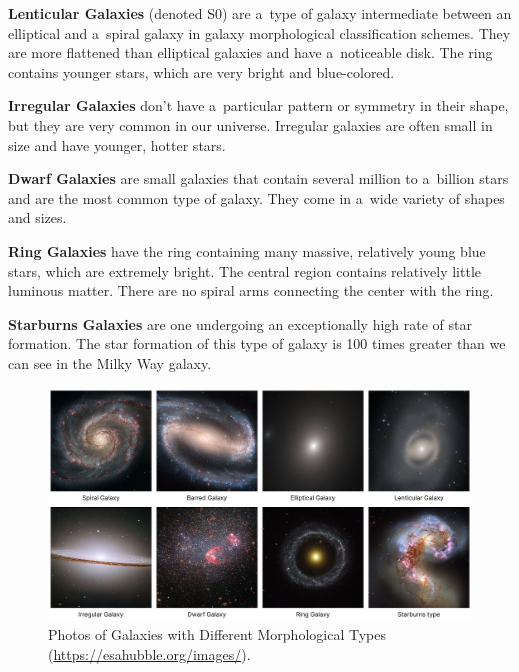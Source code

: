 \medskip

\textbf{Lenticular Galaxies} (denoted S0) are a~type of galaxy intermediate between an elliptical and a~spiral galaxy in galaxy morphological classification schemes. They are more flattened than elliptical galaxies and have a~noticeable disk. The ring contains younger stars, which are very bright and blue-colored.

\medskip

\textbf{Irregular Galaxies} don’t have a~particular pattern or symmetry in their shape, but they are very common in our universe. Irregular galaxies are often small in size and have younger, hotter stars.

\medskip

\textbf{Dwarf Galaxies} are small galaxies that contain several million to a~billion stars and are the most common type of galaxy. They come in a~wide variety of shapes and sizes.

\medskip

\textbf{Ring Galaxies} have the ring containing many massive, relatively young blue stars, which are extremely bright. The central region contains relatively little luminous matter. There are no spiral arms connecting the center with the ring.

\medskip

\textbf{Starburns Galaxies} are one undergoing an exceptionally high rate of star formation. The star formation of this type of galaxy is 100 times greater than we can see in the Milky Way galaxy.

\begin{figure}[htbp]
    \centering
    \includegraphics[width=\textwidth]{obrazky-figures/02-theoretical-basis/galaxies-types.jpg}
    \caption{Photos of Galaxies with Different Morphological Types (\url{https://esahubble.org/images/}).}
\end{figure}

